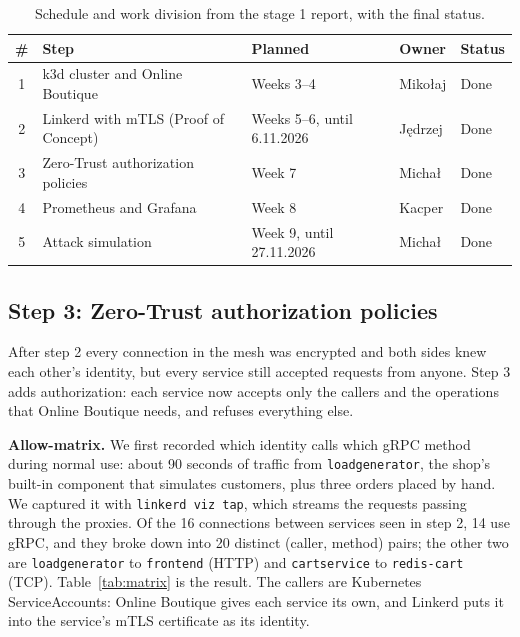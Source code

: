\documentclass[12pt,a4paper]{article}
\begin{document}
\begin{table}[H]
  \centering
  \small
  \begin{tabular}{cllll}
    \toprule
    \# & Step & Planned & Owner & Status \\
    \midrule
    1 & k3d cluster and Online Boutique      & Weeks 3--4                  & Mikołaj  & Done \\
    2 & Linkerd with mTLS (Proof of Concept) & Weeks 5--6, until 6.11.2026 & Jędrzej  & Done \\
    3 & Zero-Trust authorization policies    & Week 7                      & Michał   & Done \\
    4 & Prometheus and Grafana               & Week 8                      & Kacper   & Done \\
    5 & Attack simulation                    & Week 9, until 27.11.2026    & Michał   & Done \\
    \bottomrule
  \end{tabular}
  \caption{Schedule and work division from the stage 1 report, with the final
    status.}
\end{table}

\subsection*{Step 3: Zero-Trust authorization policies}

After step 2 every connection in the mesh was encrypted and both sides knew
each other's identity, but every service still accepted requests from anyone.
Step 3 adds authorization: each service now accepts only the callers and the
operations that Online Boutique needs, and refuses everything else.

\textbf{Allow-matrix.} We first recorded which identity calls which gRPC
method during normal use: about 90 seconds of traffic from
\texttt{loadgenerator}, the shop's built-in component that simulates
customers, plus three orders placed by hand. We captured it with
\texttt{linkerd viz tap}, which streams the requests passing through the
proxies. Of the 16 connections between services seen in step 2, 14 use gRPC,
and they broke down into 20 distinct (caller, method) pairs; the other two
are \texttt{loadgenerator} to \texttt{frontend} (HTTP) and
\texttt{cartservice} to \texttt{redis-cart} (TCP). Table~\ref{tab:matrix}
is the result. The
callers are Kubernetes ServiceAccounts: Online Boutique gives each service its
own, and Linkerd puts it into the service's mTLS certificate as its identity.
\end{document}
